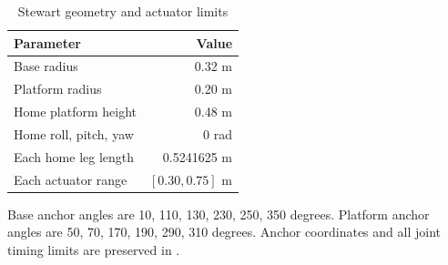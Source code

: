 \begin{table}[H]\centering\caption{Stewart geometry and actuator limits}
\begin{tabular}{lr}\toprule Parameter&Value\\\midrule Base radius&0.32 m\\Platform radius&0.20 m\\Home platform height&0.48 m\\Home roll, pitch, yaw&0 rad\\Each home leg length&0.5241625 m\\Each actuator range&$[0.30,0.75]$ m\\\bottomrule\end{tabular}\end{table}
Base anchor angles are 10, 110, 130, 230, 250, 350 degrees. Platform anchor angles are 50, 70, 170, 190, 290, 310 degrees. Anchor coordinates and all joint timing limits are preserved in .